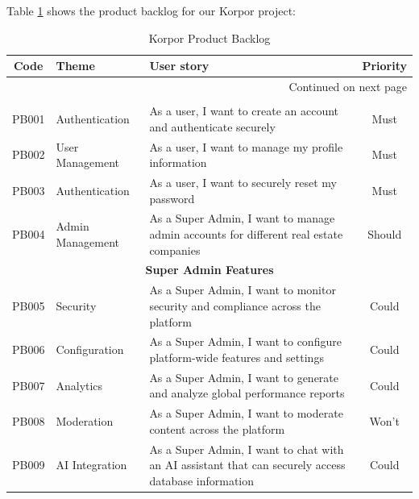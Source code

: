 Table \ref{tab:product-backlog} shows the product backlog for our Korpor project:

\begin{longtable}{|c|l|p{8cm}|c|}
    \caption{Korpor Product Backlog\label{tab:product-backlog}} \\
        \hline
        \textbf{Code} & \textbf{Theme} & \textbf{User story} & \textbf{Priority} \\
        \hline
    \endfirsthead
    
    \hline
    \endhead
    
    \hline \multicolumn{4}{|r|}{{Continued on next page}} \\ \hline
    \endfoot
    
    \hline
    \endlastfoot
    
    \multicolumn{4}{|c|}{\cellcolor{primary!15}\textbf{\textcolor{primary}{Authentication \& User Management}}} \\
    \hline
    PB001 & Authentication & As a user, I want to create an account and authenticate securely & Must \\
    \hline
    PB002 & User Management & As a user, I want to manage my profile information & Must \\
    \hline
    PB003 & Authentication & As a user, I want to securely reset my password & Must \\
    \hline
    PB004 & Admin Management & As a Super Admin, I want to manage admin accounts for different real estate companies & Should \\
    
    
    \multicolumn{4}{|c|}{\cellcolor{primary!15}\textbf{\textcolor{primary}{Super Admin Features}}} \\
    \hline
    PB005 & Security & As a Super Admin, I want to monitor security and compliance across the platform & Could \\
    \hline
    PB006 & Configuration & As a Super Admin, I want to configure platform-wide features and settings & Could \\
    \hline
    PB007 & Analytics & As a Super Admin, I want to generate and analyze global performance reports & Could \\
    \hline
    PB008 & Moderation & As a Super Admin, I want to moderate content across the platform & Won't \\
    \hline
    PB009 & AI Integration & As a Super Admin, I want to chat with an AI assistant that can securely access database information & Could \\
    \hline
    



\end{longtable}
